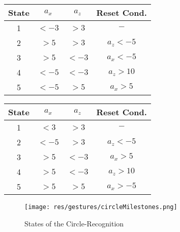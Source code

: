 \begin{minipage}{0.45\textwidth}
\footnotesize
\begin{tabular}{c|c|c|c}
State & $a_x$ & $a_z$ & Reset Cond. \\
\hline
1 & $< -3$ & $> 3$ & $-$\\
2 & $> 5$ & $> 3$ & $a_z < -5$ \\
3 & $> 5$ & $< -3$ & $a_x < -5$ \\
4 & $< -5$ & $< -3$ & $a_z > 10$ \\
5 & $< -5$ & $> 5$ & $a_x > 5$  
\end{tabular}
\label{tab:milestonesCw}
\end{minipage}\hspace{0.1\textwidth}
\begin{minipage}{0.45\textwidth}
\footnotesize
\begin{tabular}{c|c|c|c}
State & $a_x$ & $a_z$ & Reset Cond. \\
\hline
1 & $< 3$ & $> 3$ & $-$\\
2 & $< -5$ & $> 3$ & $a_z < -5$ \\
3 & $> 5$ & $< -3$ & $a_x > 5$ \\
4 & $> 5$ & $< -3$ & $a_z > 10$ \\
5 & $> 5$ & $> 5$ & $a_x > -5$  
\end{tabular}
\label{tab:milestonesCcw}
\end{minipage}

\begin{figure}
\centering
\captionsetup{justification=centering}
\texttt{[image: res/gestures/circleMilestones.png]}
\caption{States of the Circle-Recognition}
\label{fig:circleStates}
\end{figure}